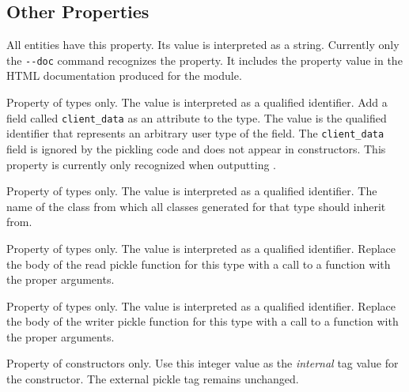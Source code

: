 \subsection{Other Properties}
\begin{description}
    All entities have this property. Its value is interpreted as a
    string. Currently only the \lstinline!--doc! command recognizes the
    property. It includes the property value in the HTML documentation
    produced for the module.

    Property of types only.	The value is interpreted as a qualified
    identifier. Add a field called \lstinline!client_data! as an
    attribute to the type. The value is the qualified identifier that
    represents an arbitrary user type of the field. The \lstinline!client_data!
    field is ignored by the pickling code and does not appear in
    constructors. This property is currently only recognized when
    outputting \Cplusplus{}.


    Property of types only. The value is interpreted as a qualified
    identifier. The name of the class from which all classes generated
    for that type should inherit from.

   Property of types only. The value is interpreted as a qualified
   identifier.  Replace the body of the read pickle function for this
   type with a call to a function with the proper arguments.

   Property of types only. The value is interpreted as a qualified
   identifier.  Replace the body of the writer pickle function for this
   type with a call to a function with the proper arguments.

   Property of constructors only.
   Use this integer value as the \emph{internal} tag value for the
   constructor. The external pickle tag remains unchanged.

\end{description}%
